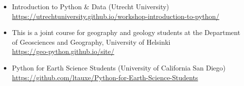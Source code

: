 

\begin{itemize}
\item Introduction to Python \& Data (Utrecht University)\\
\url{https://utrechtuniversity.github.io/workshop-introduction-to-python/}

\item 
This is a joint course for geography and geology students at the Department of 
Geosciences and Geography, University of Helsinki\\
\url{https://geo-python.github.io/site/}

\item Python for Earth Science Students (University of California San Diego)\\
\url{https://github.com/ltauxe/Python-for-Earth-Science-Students}
\end{itemize}
